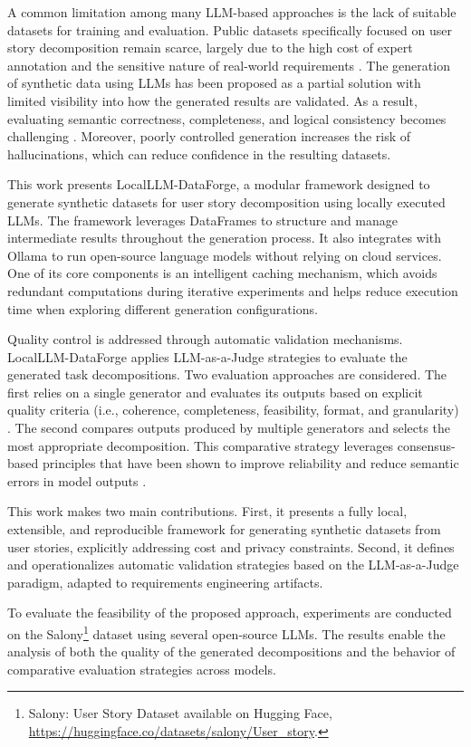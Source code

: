 \documentclass[pdflatex,sn-mathphys-num]{sn-jnl}%
\theoremstyle{thmstyleone}%
\theoremstyle{thmstyletwo}%
\theoremstyle{thmstylethree}%
\begin{document}
A common limitation among many LLM-based approaches is the lack of suitable datasets for training and evaluation. Public datasets specifically focused on user story decomposition remain scarce, largely due to the high cost of expert annotation and the sensitive nature of real-world requirements \cite{fucci2020}. The generation of synthetic data using LLMs has been proposed as a partial solution with limited visibility into how the generated results are validated. As a result, evaluating semantic correctness, completeness, and logical consistency becomes challenging \cite{liu2023}. Moreover, poorly controlled generation increases the risk of hallucinations, which can reduce confidence in the resulting datasets.

This work presents LocalLLM-DataForge, a modular framework designed to generate synthetic datasets for user story decomposition using locally executed LLMs. The framework leverages DataFrames to structure and manage intermediate results throughout the generation process. It also integrates with Ollama to run open-source language models without relying on cloud services. One of its core components is an intelligent caching mechanism, which avoids redundant computations during iterative experiments and helps reduce execution time when exploring different generation configurations.

Quality control is addressed through automatic validation mechanisms. LocalLLM-DataForge applies LLM-as-a-Judge strategies to evaluate the generated task decompositions. Two evaluation approaches are considered. The first relies on a single generator and evaluates its outputs based on explicit quality criteria (i.e., coherence, completeness, feasibility, format, and granularity) \cite{chiang2023}. The second compares outputs produced by multiple generators and selects the most appropriate decomposition. This comparative strategy leverages consensus-based principles that have been shown to improve reliability and reduce semantic errors in model outputs \cite{wang2023, li2024}.

This work makes two main contributions. First, it presents a fully local, extensible, and reproducible framework for generating synthetic datasets from user stories, explicitly addressing cost and privacy constraints. Second, it defines and operationalizes automatic validation strategies based on the LLM-as-a-Judge paradigm, adapted to requirements engineering artifacts.

To evaluate the feasibility of the proposed approach, experiments are conducted on the Salony\footnote{Salony: User Story Dataset available on Hugging Face, \url{https://huggingface.co/datasets/salony/User_story}.} dataset using several open-source LLMs. The results enable the analysis of both the quality of the generated decompositions and the behavior of comparative evaluation strategies across models.
\end{document}
